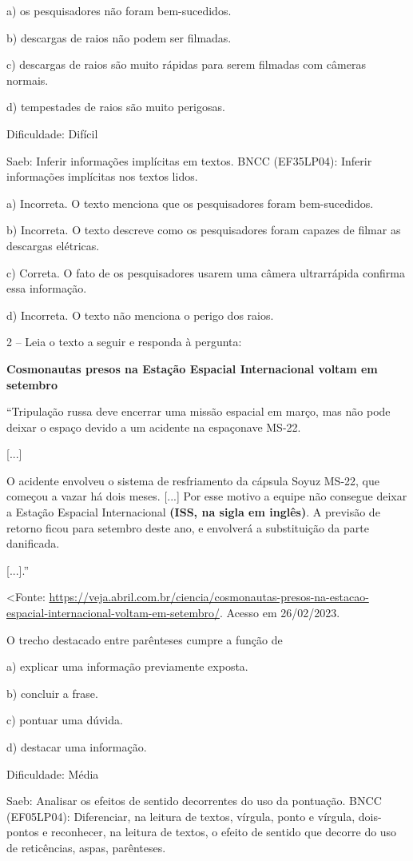 a) os pesquisadores não foram bem-sucedidos.

b) descargas de raios não podem ser filmadas.

c) descargas de raios são muito rápidas para serem filmadas com câmeras
normais.

d) tempestades de raios são muito perigosas.

Dificuldade: Difícil

Saeb: Inferir informações implícitas em textos. BNCC (EF35LP04): Inferir
informações implícitas nos textos lidos.

a) Incorreta. O texto menciona que os pesquisadores foram bem-sucedidos.

b) Incorreta. O texto descreve como os pesquisadores foram capazes de
filmar as descargas elétricas.

c) Correta. O fato de os pesquisadores usarem uma câmera ultrarrápida
confirma essa informação.

d) Incorreta. O texto não menciona o perigo dos raios.

2 -- Leia o texto a seguir e responda à pergunta:

\textbf{Cosmonautas presos na Estação Espacial Internacional voltam em
setembro}

``Tripulação russa deve encerrar uma missão espacial em março, mas não
pode deixar o espaço devido a um acidente na espaçonave MS-22.

{[}...{]}

O acidente envolveu o sistema de resfriamento da cápsula Soyuz MS-22,
que começou a vazar há dois meses. {[}...{]} Por esse motivo a equipe
não consegue deixar a Estação Espacial Internacional \textbf{(ISS, na
sigla em inglês)}. A previsão de retorno ficou para setembro deste ano,
e envolverá a substituição da parte danificada.

{[}...{]}.''

\textless{}Fonte:
\url{https://veja.abril.com.br/ciencia/cosmonautas-presos-na-estacao-espacial-internacional-voltam-em-setembro/}.
Acesso em 26/02/2023.

O trecho destacado entre parênteses cumpre a função de

a) explicar uma informação previamente exposta.

b) concluir a frase.

c) pontuar uma dúvida.

d) destacar uma informação.

Dificuldade: Média

Saeb: Analisar os efeitos de sentido decorrentes do uso da pontuação.
BNCC (EF05LP04): Diferenciar, na leitura de textos, vírgula, ponto e
vírgula, dois-pontos e reconhecer, na leitura de textos, o efeito de
sentido que decorre do uso de reticências, aspas, parênteses.

